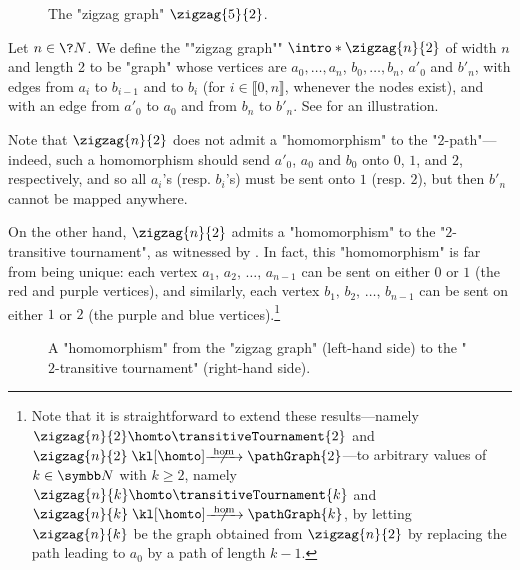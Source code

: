\begin{figure}
	\centering
	\begin{tikzpicture}
		
		
	\end{tikzpicture}
	\caption{\AP\label{fig:zigzag-graph}The "zigzag graph" $\zigzag{5}{2}$.}
\end{figure}
\begin{example}
	\AP\label{ex:zigzag-defn}
	Let $n\in\?N$.
	We define the \AP""zigzag graph"" $\intro*\zigzag{n}{2}$ of width $n$ and length 2
	to be "graph" whose vertices are $a_0, \hdots, a_n$, $b_0, \hdots, b_{n}$,
	$a'_0$ and $b'_n$, with edges from $a_i$ to $b_{i-1}$ and to $b_{i}$ (for $i \in \lBrack 0,n\rBrack$, whenever the nodes exist), and with an edge from $a'_0$ to $a_0$ and from $b_n$
	to $b'_n$. See  for an illustration.
	
	Note that $\zigzag{n}{2}$ does not admit a "homomorphism" to the "$2$-path"---indeed, such a homomorphism should send $a'_0$, $a_0$ and $b_0$ onto $0$, $1$, and $2$, respectively, 
	and so all $a_i$'s (resp. $b_i$'s) must be sent onto $1$ (resp. $2$), but then $b'_n$ cannot be mapped anywhere.

	On the other hand, $\zigzag{n}{2}$ admits a "homomorphism" to the "$2$-transitive tournament", as witnessed by .
	In fact, this "homomorphism" is far from being unique:
	each vertex $a_1,\,a_2,\,\hdots,\,a_{n-1}$ can be sent on either $0$ or $1$
	(the red and purple vertices), 
	and similarly, each vertex $b_1,\,b_2,\,\hdots,\,b_{n-1}$ can be sent on either $1$ or $2$
	(the purple and blue vertices).\footnote{Note that it is straightforward
	to extend these results---namely $\zigzag{n}{2} \homto \transitiveTournament{2}$
	and $\zigzag{n}{2} \nothomto \pathGraph{2}$---to arbitrary values of $k\in \N$ with
	$k\geq 2$, namely $\zigzag{n}{k} \homto \transitiveTournament{k}$
	and $\zigzag{n}{k} \nothomto \pathGraph{k}$, by letting
	$\zigzag{n}{k}$ be the graph obtained from $\zigzag{n}{2}$ by
	replacing the path leading to $a_0$ by a path of length $k-1$.
	}
\end{example}
\begin{figure}
	\centering 
	\begin{tikzpicture}
		
	\end{tikzpicture}
	\caption{\AP\label{fig:zigzag-graph-hom-T2}A "homomorphism" from the "zigzag graph" (left-hand side) to the "$2$-transitive tournament" (right-hand side).}
\end{figure}